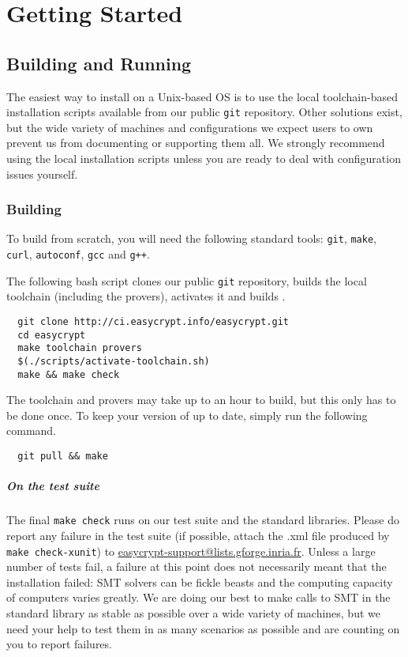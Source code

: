 
\chapter{Getting Started}
\section{Building and Running \EasyCrypt}
The easiest way to install \EasyCrypt on a Unix-based OS is to use the local
toolchain-based installation scripts available from our public \texttt{git}
repository. Other solutions exist, but the wide variety of machines and
configurations we expect \EasyCrypt users to own prevent us from documenting or
supporting them all. We strongly recommend using the local installation scripts
unless you are ready to deal with configuration issues yourself.

\subsection{Building \EasyCrypt}
To build \EasyCrypt from scratch, you will need the following standard tools:
\texttt{git}, \texttt{make}, \texttt{curl}, \texttt{autoconf}, \texttt{gcc} and \texttt{g++}.

The following bash script clones our public \texttt{git} repository, builds the
local toolchain (including the provers), activates it and builds \EasyCrypt.

\begin{verbatim}
  git clone http://ci.easycrypt.info/easycrypt.git 
  cd easycrypt
  make toolchain provers
  $(./scripts/activate-toolchain.sh)
  make && make check
\end{verbatim}

The toolchain and provers may take up to an hour to build, but this only has to
be done once. To keep your version of \EasyCrypt up to date, simply run the
following command.

\begin{verbatim}
  git pull && make
\end{verbatim}

\paragraph{On the test suite}
The final \texttt{make check} runs \EasyCrypt on our test suite and the standard
libraries. Please do report any failure in the test suite (if possible, attach
the .xml file produced by \texttt{make check-xunit}) to
\url{easycrypt-support@lists.gforge.inria.fr}. Unless a large number of tests
fail, a failure at this point does not necessarily meant that the installation
failed: SMT solvers can be fickle beasts and the computing capacity of computers
varies greatly. We are doing our best to make calls to SMT in the standard
library as stable as possible over a wide variety of machines, but we need your
help to test them in as many scenarios as possible and are counting on you to
report failures.

